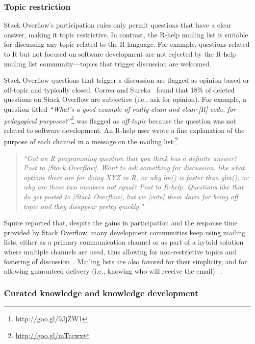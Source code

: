 \documentclass[smallextended]{svjour3}       %
\newcommand{\SO}{Stack Overflow\xspace}
\newcommand{\RH}{R-help\xspace}
\begin{document}
                
\subsubsection{Topic restriction}

\SO's participation rules only permit questions that have a clear answer, making it topic restrictive. In contrast, the \RH mailing list is suitable for discussing
any topic related to the R language. For example, questions related to R but not focused on software development are not rejected by the \RH mailing list community---topics that trigger discussion are welcomed.

\SO questions that trigger a discussion are flagged as opinion-based or off-topic and typically closed. Correa and Sureka~\cite{Correa2014} found that 18\% of deleted questions on \SO are subjective (i.e., ask for opinion).
For example, a question titled \textit{``What's a good example of really clean and clear [R] code, for pedagogical purposes?''}\footnote{http://goo.gl/9JjZW1} was flagged as \textit{off-topic} because the question was not related to software development.
An \RH user wrote a fine explanation of the purpose of each channel in a message on the mailing list:\footnote{\url{http://goo.gl/mTccwx}}
    \begin{quote}
        \textit{``Got an R programming question that you think has a definite answer? Post to [\SO]. Want to ask something for discussion, like what options there are for doing XYZ in R, or why lm() is faster than glm(), or why are these two numbers not equal? Post to \RH. Questions like that do get posted to [\SO], but we [vote] them down for being off topic and they disappear pretty quickly.''}
    \end{quote}

Squire reported that, despite the gains in participation and the response time provided by \SO, many development communities keep using mailing lists, either as
a primary communication channel or as part of a hybrid solution where multiple channels are used, thus allowing for non-restrictive topics and fostering of
discussion~\cite{Squire2015a}.
Mailing lists are also favored for their simplicity, and for allowing guaranteed delivery (i.e., knowing who will receive the email) ~\cite{Zhang2015}.

        
\subsubsection{Curated knowledge and knowledge development}
\end{document}
